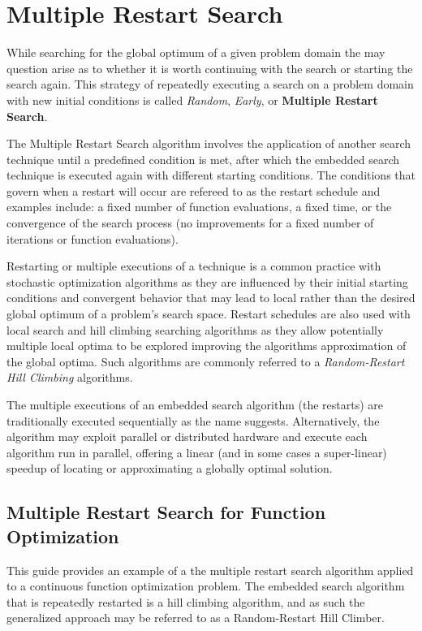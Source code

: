 \section{Multiple Restart Search}
While searching for the global optimum of a given problem domain the may question arise as to whether it is worth continuing with the search or starting the search again. This strategy of repeatedly executing a search on a problem domain with new initial conditions is called \emph{Random}, \emph{Early}, or \textbf{Multiple Restart Search}.

The Multiple Restart Search algorithm involves the application of another search technique until a predefined condition is met, after which the embedded search technique is executed again with different starting conditions. The conditions that govern when a restart will occur are refereed to as the restart schedule and examples include: a fixed number of function evaluations, a fixed time, or the convergence of the search process (no improvements for a fixed number of iterations or function evaluations).

Restarting or multiple executions of a technique is a common practice with stochastic optimization algorithms as they are influenced by their initial starting conditions and convergent behavior that may lead to local rather than the desired global optimum of a problem's search space. Restart schedules are also used with local search and hill climbing searching algorithms as they allow potentially multiple local optima to be explored improving the algorithms approximation of the global optima. Such algorithms are commonly referred to a \emph{Random-Restart Hill Climbing} algorithms.

The multiple executions of an embedded search algorithm (the restarts) are traditionally executed sequentially as the name suggests. Alternatively, the algorithm may exploit parallel or distributed hardware and execute each algorithm run in parallel, offering a linear (and in some cases a super-linear) speedup of locating or approximating a globally optimal solution.

\subsection{Multiple Restart Search for Function Optimization}
This guide provides an example of a the multiple restart search algorithm applied to a continuous function optimization problem. The embedded search algorithm that is repeatedly restarted is a hill climbing algorithm, and as such the generalized approach may be referred to as a Random-Restart Hill Climber.

